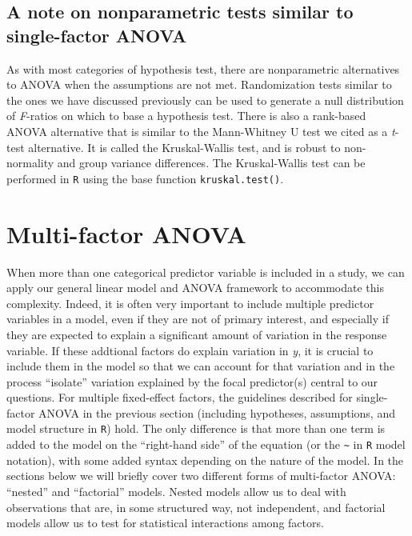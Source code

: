 \documentclass[
]{book}
\begin{document}
\hypertarget{a-note-on-nonparametric-tests-similar-to-single-factor-anova}{%
\subsection{A note on nonparametric tests similar to single-factor ANOVA}\label{a-note-on-nonparametric-tests-similar-to-single-factor-anova}}

As with most categories of hypothesis test, there are nonparametric alternatives to ANOVA when the assumptions are not met. Randomization tests similar to the ones we have discussed previously can be used to generate a null distribution of \emph{F}-ratios on which to base a hypothesis test. There is also a rank-based ANOVA alternative that is similar to the Mann-Whitney U test we cited as a \emph{t}-test alternative. It is called the Kruskal-Wallis test, and is robust to non-normality and group variance differences. The Kruskal-Wallis test can be performed in \texttt{R} using the base function \texttt{kruskal.test()}.

\hypertarget{multi-factor-anova}{%
\section{Multi-factor ANOVA}\label{multi-factor-anova}}

When more than one categorical predictor variable is included in a study, we can apply our general linear model and ANOVA framework to accommodate this complexity. Indeed, it is often very important to include multiple predictor variables in a model, even if they are not of primary interest, and especially if they are expected to explain a significant amount of variation in the response variable. If these addtional factors do explain variation in \emph{y}, it is crucial to include them in the model so that we can account for that variation and in the process ``isolate'' variation explained by the focal predictor(s) central to our questions. For multiple fixed-effect factors, the guidelines described for single-factor ANOVA in the previous section (including hypotheses, assumptions, and model structure in \texttt{R}) hold. The only difference is that more than one term is added to the model on the ``right-hand side'' of the equation (or the \texttt{\textasciitilde{}} in \texttt{R} model notation), with some added syntax depending on the nature of the model. In the sections below we will briefly cover two different forms of multi-factor ANOVA: ``nested'' and ``factorial'' models. Nested models allow us to deal with observations that are, in some structured way, not independent, and factorial models allow us to test for statistical interactions among factors.
\end{document}
